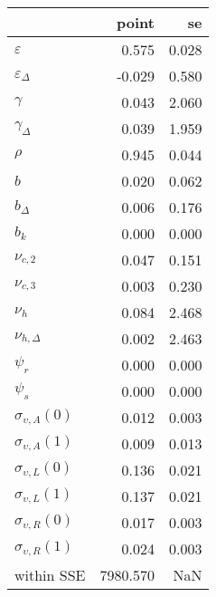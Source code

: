 \begin{tabular}{lrr}
\toprule
{} &     point &     se \\
\midrule
$\varepsilon$            &     0.575 &  0.028 \\
$\varepsilon_{\Delta}$   &    -0.029 &  0.580 \\
$\gamma$                 &     0.043 &  2.060 \\
$\gamma_{\Delta}$        &     0.039 &  1.959 \\
$\rho$                   &     0.945 &  0.044 \\
$b$                      &     0.020 &  0.062 \\
$b_{\Delta}$             &     0.006 &  0.176 \\
$b_k$                    &     0.000 &  0.000 \\
$\nu_{c,2}$              &     0.047 &  0.151 \\
$\nu_{c,3}$              &     0.003 &  0.230 \\
$\nu_{h}$                &     0.084 &  2.468 \\
$\nu_{h,\Delta}$         &     0.002 &  2.463 \\
$\psi_{r}$               &     0.000 &  0.000 \\
$\psi_{s}$               &     0.000 &  0.000 \\
$\sigma_{\upsilon,A}(0)$ &     0.012 &  0.003 \\
$\sigma_{\upsilon,A}(1)$ &     0.009 &  0.013 \\
$\sigma_{\upsilon,L}(0)$ &     0.136 &  0.021 \\
$\sigma_{\upsilon,L}(1)$ &     0.137 &  0.021 \\
$\sigma_{\upsilon,R}(0)$ &     0.017 &  0.003 \\
$\sigma_{\upsilon,R}(1)$ &     0.024 &  0.003 \\
within SSE               &  7980.570 &    NaN \\
\bottomrule
\end{tabular}
